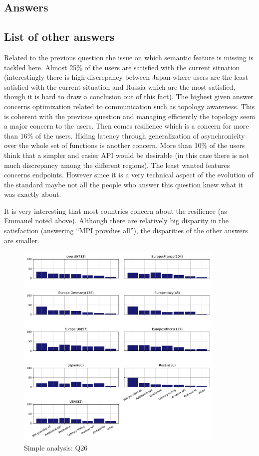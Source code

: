 
\subsection{Answers}


\subsection{List of other answers}
\begin{itemize}

\end{itemize}

Related to the previous question the issue on which semantic feature is missing is tackled here. Almost 25\% of the
users are satisfied with the current situation (interestingly there is high
discrepancy between Japan where users are the least satisfied with the current
situation and Russia which are the most satisfied, though it is hard to draw a
conclusion out of this fact). The highest given answer
concerns optimization related to communication such as topology awareness. This
is coherent with the previous question and managing efficiently the topology seem
a major concern to the users. Then comes resilience which is a concern for more
than 16\% of the users. Hiding latency through generalization of asynchronicity
over the whole set of functions is another concern. More than 10\% of the
users think that a simpler and easier API would be desirable (in this case there
is not much discrepancy among the different regions).  The least wanted features
concerns endpoints. However since it is a very technical aspect of the evolution
of the standard maybe not all the people who answer this question knew what it was exactly about.  

It is very interesting that most countries concern about the
resilience (as Emmauel noted above). Although there are relatively big
disparity in the satisfaction (answering ``MPI provdies all''), the
disparities of the other answers are smaller.

\begin{figure}[htb]
\begin{center}
\includegraphics[width=10cm]{../pdfs/Q26.pdf}
\caption{Simple analysis: Q26}
\label{fig:Q26}
\end{center}
\end{figure}
